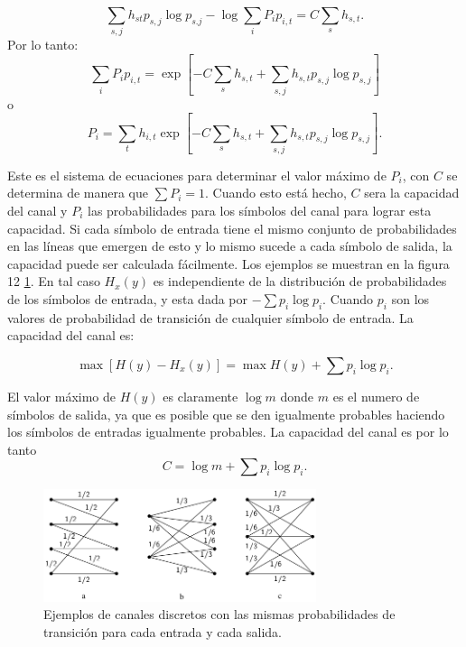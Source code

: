 \begin{equation}
  \sum_{s,j}h_{st} p_{s,j} \log{p_{s.j}} - \log{\sum_{i}P_i p_{i,t}} = C \sum_{s} h_{s,t}.
\end{equation}
Por lo tanto:
\begin{equation}
  \sum_{i} P_i p_{i,t} = \exp[- C \sum_{s} h_{s,t}+ \sum_{s,j} h_{s,t} p_{s,j} \log{p_{s,j}}]
\end{equation}
o  
\begin{equation}
  P_i = \sum_{t} h_{i,t} \exp[ - C \sum_{s} h_{s,t}+ \sum_{s,j} h_{s,t} p_{s,j} \log{p_{s,j}} ].
\end{equation}

Este es el sistema de ecuaciones para determinar el valor m\'aximo de
$P_i$, con $C$ se determina de manera que $\sum P_i = 1$. Cuando esto
est\'{a} hecho, $C$ sera la capacidad del canal y $P_i$ las
probabilidades para los s\'imbolos del canal para lograr esta
capacidad.  Si cada s\'imbolo de entrada tiene el mismo conjunto de
probabilidades en las l\'ineas que emergen de esto y lo mismo sucede a
cada s\'imbolo de salida, la capacidad puede ser calculada
f\'acilmente. Los ejemplos se muestran en la figura 12 \ref{fig:12}.
En tal caso $H_x (y)$ es independiente de la distribuci\'on de
probabilidades de los s\'imbolos de entrada, y esta dada por $-\sum
p_i \log{p_i}$. Cuando $p_i$ son los valores de probabilidad de
transici\'on de cualquier s\'imbolo de entrada. La capacidad del canal
es:

\begin{equation}
  \max [H(y) - H_x(y)] = \max H(y) + \sum p_i \log{p_i}.
\end{equation}

El valor m\'aximo de $H(y)$ es claramente  $\log{m}$ donde $m$ es el numero de s\'imbolos de salida, ya que es posible que se den 
igualmente probables haciendo los s\'imbolos de entradas igualmente probables. La capacidad del canal es por lo tanto
\begin{equation}
  C = \log{m} + \sum p_i \log{p_i}.
\end{equation}

\begin{figure}[!ht]
\centerline{\includegraphics[width=80mm]{Imagenes/SinComentarios/Pagina27-Figura12.png}}
\caption{Ejemplos de canales discretos con las mismas probabilidades de
 transici\'{o}n para cada entrada y cada salida.}
\label{fig:12}
\end{figure}


